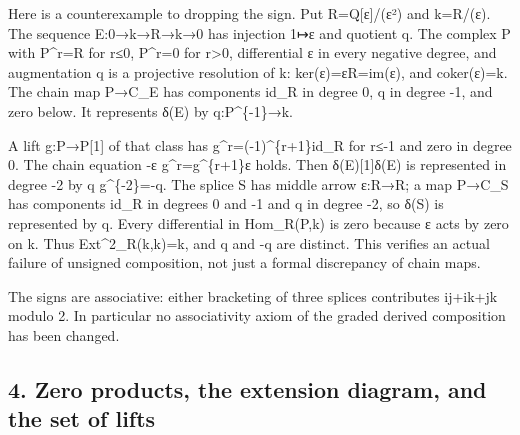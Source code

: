 \documentclass[11pt]{article}
\begin{document}
Here is a counterexample to dropping the sign. Put R\allowbreak{}=Q[ε]\allowbreak{}/\allowbreak{}(ε²)\allowbreak{} and k\allowbreak{}=R/\allowbreak{}(ε)\allowbreak{}. The sequence E:\allowbreak{}0\allowbreak{}→k\allowbreak{}→R\allowbreak{}→k\allowbreak{}→0 has injection 1\allowbreak{}↦ε and quotient q. The complex P with P\textasciicircum{}r\allowbreak{}=R for r≤0,\allowbreak{} P\textasciicircum{}r\allowbreak{}=0 for r>0,\allowbreak{} differential ε in every negative degree,\allowbreak{} and augmentation q is a projective resolution of k:\allowbreak{} ker(ε)\allowbreak{}\allowbreak{}=εR\allowbreak{}=im(ε)\allowbreak{},\allowbreak{} and coker(ε)\allowbreak{}\allowbreak{}=k. The chain map P\allowbreak{}→C\_\allowbreak{}E has components id\_\allowbreak{}R in degree 0,\allowbreak{} q in degree -1,\allowbreak{} and zero below. It represents δ(E)\allowbreak{} by q:\allowbreak{}P\textasciicircum{}\{-1\}\allowbreak{}→k.

A lift g:\allowbreak{}P\allowbreak{}→P[1]\allowbreak{} of that class has g\textasciicircum{}r\allowbreak{}=(-1)\allowbreak{}\textasciicircum{}\{r\allowbreak{}+1\}id\_\allowbreak{}R for r≤-1 and zero in degree 0. The chain equation -ε g\textasciicircum{}r\allowbreak{}=g\textasciicircum{}\{r\allowbreak{}+1\}ε holds. Then δ(E)\allowbreak{}[1]\allowbreak{}δ(E)\allowbreak{} is represented in degree -2 by q g\textasciicircum{}\{-2\}\allowbreak{}=-q. The splice S has middle arrow ε:\allowbreak{}R\allowbreak{}→R; a map P\allowbreak{}→C\_\allowbreak{}S has components id\_\allowbreak{}R in degrees 0 and -1 and q in degree -2,\allowbreak{} so δ(S)\allowbreak{} is represented by q. Every differential in Hom\_\allowbreak{}R(P,\allowbreak{}k)\allowbreak{} is zero because ε acts by zero on k. Thus Ext\textasciicircum{}2\_\allowbreak{}R(k,\allowbreak{}k)\allowbreak{}\allowbreak{}=k,\allowbreak{} and q and -q are distinct. This verifies an actual failure of unsigned composition,\allowbreak{} not just a formal discrepancy of chain maps.

The signs are associative:\allowbreak{} either bracketing of three splices contributes ij\allowbreak{}+ik\allowbreak{}+jk modulo 2. In particular no associativity axiom of the graded derived composition has been changed.

\subsection{\texorpdfstring{4. Zero products,\allowbreak{} the extension diagram,\allowbreak{} and the set of lifts}{4. Zero  the extension  and the set of lifts}}\label{proofs-8774-9196-zero-products-the-extension-diagram-and-the-set-of-lifts}
\end{document}

